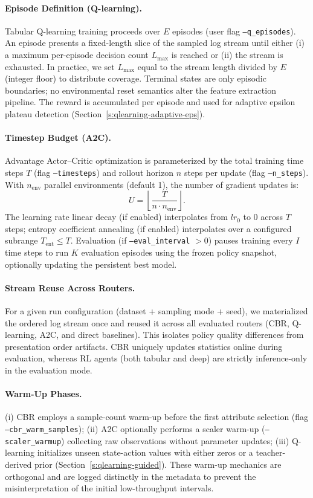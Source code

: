 \paragraph{Episode Definition (Q-learning).} Tabular Q-learning training proceeds over $E$ episodes (user flag \texttt{--q\_episodes}). An episode presents a fixed-length slice of the sampled log stream until either (i) a maximum per-episode decision count $L_{\max}$ is reached or (ii) the stream is exhausted. In practice, we set $L_{\max}$ equal to the stream length divided by $E$ (integer floor) to distribute coverage. Terminal states are only episodic boundaries; no environmental reset semantics alter the feature extraction pipeline. The reward is accumulated per episode and used for adaptive epsilon plateau detection (Section~\ref{s:qlearning-adaptive-eps}).

\paragraph{Timestep Budget (A2C).} Advantage Actor–Critic optimization is parameterized by the total training time steps $T$ (flag \texttt{--timesteps}) and rollout horizon $n$ steps per update (flag \texttt{--n\_steps}). With $n_{\text{env}}$ parallel environments (default 1), the number of gradient updates is:
\[
U = \left\lfloor \frac{T}{n \cdot n_{\text{env}}} \right\rfloor.
\]
The learning rate linear decay (if enabled) interpolates from $lr_0$ to $0$ across $T$ steps; entropy coefficient annealing (if enabled) interpolates over a configured subrange $T_{\text{ent}} \le T$. Evaluation (if \texttt{--eval\_interval} $>0$) pauses training every $I$ time steps to run $K$ evaluation episodes using the frozen policy snapshot, optionally updating the persistent best model.

\paragraph{Stream Reuse Across Routers.} For a given run configuration (dataset + sampling mode + seed), we materialized the ordered log stream once and reused it across all evaluated routers (CBR, Q-learning, A2C, and direct baselines). This isolates policy quality differences from presentation order artifacts. CBR uniquely updates statistics online during evaluation, whereas RL agents (both tabular and deep) are strictly inference-only in the evaluation mode.

\paragraph{Warm-Up Phases.} (i) CBR employs a sample-count warm-up before the first attribute selection (flag \texttt{--cbr\_warm\_samples}); (ii) A2C optionally performs a scaler warm-up (\texttt{--scaler\_warmup}) collecting raw observations without parameter updates; (iii) Q-learning initializes unseen state-action values with either zeros or a teacher-derived prior (Section~\ref{s:qlearning-guided}). These warm-up mechanics are orthogonal and are logged distinctly in the metadata to prevent the misinterpretation of the initial low-throughput intervals.


